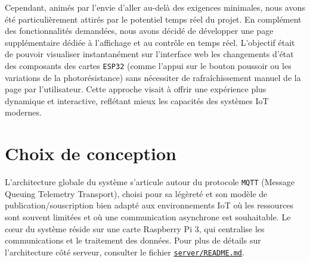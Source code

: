 \documentclass[12pt]{article}
\begin{document}
Cependant, animés par l'envie d'aller au-delà des exigences minimales, nous avons été particulièrement attirés par le potentiel temps réel du projet. En complément des fonctionnalités demandées, nous avons décidé de développer une page supplémentaire dédiée à l'affichage et au contrôle en temps réel. L'objectif était de pouvoir visualiser instantanément sur l'interface web les changements d'état des composants des cartes \texttt{ESP32} (comme l'appui sur le bouton poussoir ou les variations de la photorésistance) sans nécessiter de rafraîchissement manuel de la page par l'utilisateur. Cette approche visait à offrir une expérience plus dynamique et interactive, reflétant mieux les capacités des systèmes IoT modernes.

\section{Choix de conception}

L'architecture globale du système s'articule autour du protocole \texttt{MQTT} (Message Queuing Telemetry Transport), choisi pour sa légèreté et son modèle de publication/souscription bien adapté aux environnements IoT où les ressources sont souvent limitées et où une communication asynchrone est souhaitable. Le cœur du système réside sur une carte Raspberry Pi 3, qui centralise les communications et le traitement des données. Pour plus de détails sur l'architecture côté serveur, consulter le fichier \href{https://github.com/GreengagePlum/Project-IOT/blob/v1.0.0/server/README.md}{\texttt{server/README.md}}.
\end{document}
